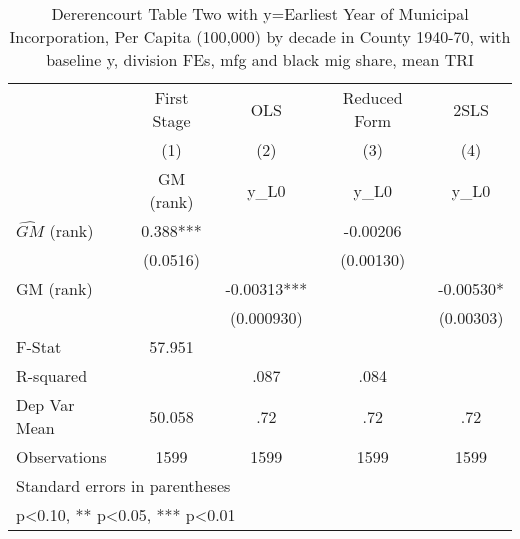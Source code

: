 \begin{table}[htbp]\centering
\def\sym#1{\ifmmode^{#1}\else\(^{#1}\)\fi}
\caption{Dererencourt Table Two with y=Earliest Year of Municipal Incorporation, Per Capita (100,000) by decade in County 1940-70, with baseline y, division FEs, mfg and black mig share, mean TRI}
\begin{tabular}{l*{4}{c}}
\toprule
                    & First Stage   &         OLS   &Reduced Form   &        2SLS   \\
                    &\multicolumn{1}{c}{(1)}&\multicolumn{1}{c}{(2)}&\multicolumn{1}{c}{(3)}&\multicolumn{1}{c}{(4)}\\
                    &\multicolumn{1}{c}{GM  (rank)}&\multicolumn{1}{c}{y\_L0}&\multicolumn{1}{c}{y\_L0}&\multicolumn{1}{c}{y\_L0}\\
\midrule
$\hat{GM}$ (rank)   &       0.388***&               &    -0.00206   &               \\
                    &    (0.0516)   &               &   (0.00130)   &               \\
\addlinespace
GM  (rank)          &               &    -0.00313***&               &    -0.00530*  \\
                    &               &  (0.000930)   &               &   (0.00303)   \\
\midrule
F-Stat              &      57.951   &               &               &               \\
R-squared           &               &        .087   &        .084   &               \\
Dep Var Mean        &      50.058   &         .72   &         .72   &         .72   \\
Observations        &        1599   &        1599   &        1599   &        1599   \\
\bottomrule
\multicolumn{5}{l}{\footnotesize Standard errors in parentheses}\\
\multicolumn{5}{l}{\footnotesize * p<0.10, ** p<0.05, *** p<0.01}\\
\end{tabular}
\end{table}
